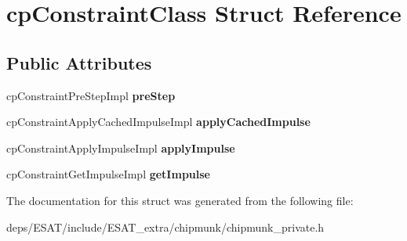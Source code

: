 \hypertarget{structcp_constraint_class}{}\section{cp\+Constraint\+Class Struct Reference}
\label{structcp_constraint_class}
\subsection*{Public Attributes}
\begin{DoxyCompactItemize}
\item 
\mbox{\label{structcp_constraint_class_a0424d3d9d2ea5c12ad70fbbfc5400e64}} 
cp\+Constraint\+Pre\+Step\+Impl {\bfseries pre\+Step}
\item 
\mbox{\label{structcp_constraint_class_a63a5a24947dcc70b3a3c145efb765cdb}} 
cp\+Constraint\+Apply\+Cached\+Impulse\+Impl {\bfseries apply\+Cached\+Impulse}
\item 
\mbox{\label{structcp_constraint_class_aaf394b027a670164f6453a85dfa13eb4}} 
cp\+Constraint\+Apply\+Impulse\+Impl {\bfseries apply\+Impulse}
\item 
\mbox{\label{structcp_constraint_class_a3702fa721f9c2ccabf32eb81339fd8dc}} 
cp\+Constraint\+Get\+Impulse\+Impl {\bfseries get\+Impulse}
\end{DoxyCompactItemize}


The documentation for this struct was generated from the following file\+:\begin{DoxyCompactItemize}
\item 
deps/\+E\+S\+A\+T/include/\+E\+S\+A\+T\+\_\+extra/chipmunk/chipmunk\+\_\+private.\+h\end{DoxyCompactItemize}
